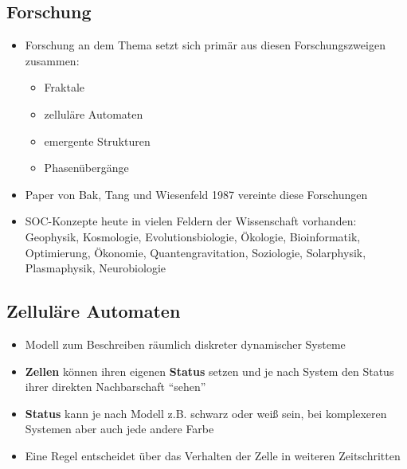 \documentclass{beamer}
\begin{document}
\subsection{Forschung}
\begin{frame}{\insertsection}{\insertsubsection}
    \begin{itemize}
        \pause
        \item Forschung an dem Thema setzt sich primär aus diesen Forschungszweigen zusammen:
        \begin{itemize}
            \item Fraktale
            \item zelluläre Automaten
            \item emergente Strukturen
            \item Phasenübergänge
        \end{itemize}
        \pause
        \item Paper von Bak, Tang und Wiesenfeld 1987 vereinte diese Forschungen
        \pause
        \item SOC-Konzepte heute in vielen Feldern der Wissenschaft vorhanden: Geophysik,
                Kosmologie, Evolutionsbiologie, Ökologie, Bioinformatik, Optimierung, Ökonomie,
                Quantengravitation, Soziologie, Solarphysik, Plasmaphysik, Neurobiologie
    \end{itemize}
\end{frame}

\subsection{Zelluläre Automaten}
\begin{frame}{\insertsection}{\insertsubsection}
    \begin{itemize}
        \pause
        \item Modell zum Beschreiben räumlich diskreter dynamischer Systeme
        \pause
        \item \textbf{Zellen} können ihren eigenen \textbf{Status} setzen und je nach System
            den Status ihrer direkten Nachbarschaft ``sehen''
        \item \textbf{Status} kann je nach Modell z.B. schwarz oder weiß sein, bei komplexeren
            Systemen aber auch jede andere Farbe
        \pause
        \item Eine Regel entscheidet über das Verhalten der Zelle in weiteren Zeitschritten
    \end{itemize}
\end{frame}
\end{document}
